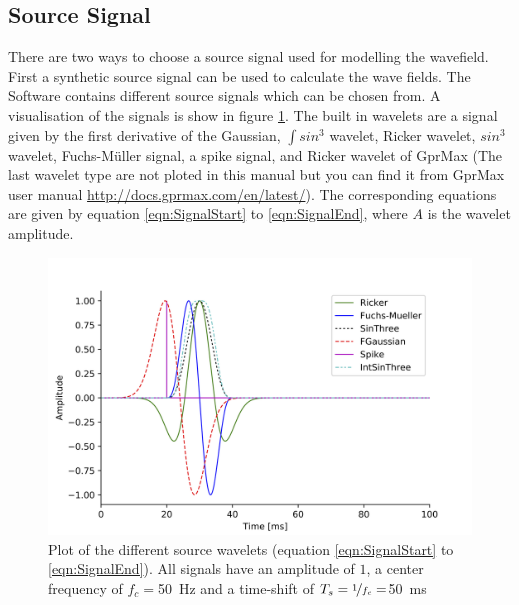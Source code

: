 \documentclass[pdftex,a4paper,parskip,listof=totoc,bibliography=totoc,onehalfspacing,12pt]{scrreprt}
\begin{document}
\subsection{Source Signal}\label{sec:sourcesignal}
There are two ways to choose a source signal used for modelling the wavefield. First a synthetic source signal can be used to calculate the wave fields. The Software contains different source signals which can be chosen from. A visualisation of the signals is show in figure \ref{fig:Signal}. The built in wavelets are a signal given by the first derivative of the Gaussian, $\int sin^3$ wavelet, Ricker wavelet, $sin^3$ wavelet, Fuchs-M\"uller signal, a spike signal, and Ricker wavelet of GprMax (The last wavelet type are not ploted in this manual but you can find it from GprMax user manual \url{http://docs.gprmax.com/en/latest/}). The corresponding equations are given by equation \ref{eqn:SignalStart} to \ref{eqn:SignalEnd}, where $A$ is the wavelet amplitude.
\begin{figure}[h!]
\centering
	\includegraphics[width=.7\textwidth]{images/Signal_Plot.png}
	\caption[Plot of the different source wavelets.]{Plot of the different source wavelets (equation \ref{eqn:SignalStart} to \ref{eqn:SignalEnd}). All signals have an amplitude of $1$, a center frequency of $f_c = $\SI{50}{Hz} and a time-shift of $T_s=\nicefrac{1}{f_c}=$\SI{50}{ms}}\label{fig:Signal}
\end{figure}
\end{document}
